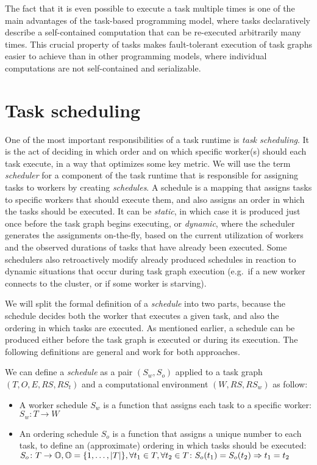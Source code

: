 The fact that it is even possible to execute a task multiple times is one of the main advantages of
the task-based programming model, where tasks declaratively describe a self-contained computation
that can be re-executed arbitrarily many times. This crucial property of tasks makes fault-tolerant
execution of task graphs easier to achieve than in other programming models, where individual
computations are not self-contained and serializable.

\section{Task scheduling}
\label{sec:task-scheduling}
One of the most important responsibilities of a task runtime is \emph{task scheduling}. It is the
act of deciding in which order and on which specific worker(s) should each task execute, in a way
that optimizes some key metric. We will use the term \emph{scheduler} for a component of the
task runtime that is responsible for assigning tasks to workers by creating \emph{schedules}.
A schedule is a mapping that assigns tasks to specific workers that should execute them, and also
assigns an order in which the tasks should be executed. It can be \emph{static}, in which
case it is produced just once before the task graph begins executing, or \emph{dynamic},
where the scheduler generates the assignments on-the-fly, based on the current utilization of
workers and the observed durations of tasks that have already been executed. Some schedulers also
retroactively modify already produced schedules in reaction to dynamic situations that occur during
task graph execution (e.g.\ if a new worker connects to the cluster, or if some worker is
starving).

We will split the formal definition of a \emph{schedule} into two parts, because the
schedule decides both the worker that executes a given task, and also the ordering in which tasks
are executed. As mentioned earlier, a schedule can be produced either before the task graph is
executed or during its execution. The following definitions are general and work for both
approaches.

We can define a \emph{schedule} as a pair $(S_w, S_o)$ applied to a task graph
$(T, O, E, RS, RS_t)$ and a computational environment $(W, RS, RS_w)$ as follow:

\begin{itemize}[itemsep=0pt]
	\item A worker schedule $S_w$ is a function that assigns each task to a specific worker:
	      \\ $S_w\colon T \rightarrow W$
	\item An ordering schedule $S_o$ is a function that assigns a unique number to each
	      task, to define an (approximate) ordering in which tasks should be executed: \\
	      $S_o\colon T \rightarrow \mathbb{O}, \mathbb{O} = \{1,\ldots,|T|\},
		      \forall t_1\in{}T, \forall t_2\in{}T\colon S_o(t_1) = S_o(t_2) \Rightarrow t_1 = t_2$
\end{itemize}

